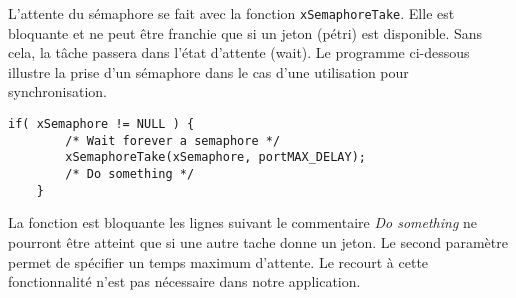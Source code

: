 L'attente du sémaphore se fait avec la fonction \texttt{xSemaphoreTake}.
Elle est bloquante et ne peut être franchie que si un jeton (pétri) est disponible.
Sans cela, la tâche passera dans l'état d'attente (wait).
Le programme ci-dessous illustre la prise d'un sémaphore dans le cas d'une utilisation pour synchronisation.
\begin{lstlisting}[style=CStyle]
    if( xSemaphore != NULL ) {
        /* Wait forever a semaphore */
        xSemaphoreTake(xSemaphore, portMAX_DELAY);
        /* Do something */
    }
\end{lstlisting}
La fonction est bloquante les lignes suivant le commentaire \textit{Do something} ne pourront être atteint que si une autre tache donne un jeton.
Le second paramètre permet de spécifier un temps maximum d'attente.
Le recourt à cette fonctionnalité n'est pas nécessaire dans notre application.

